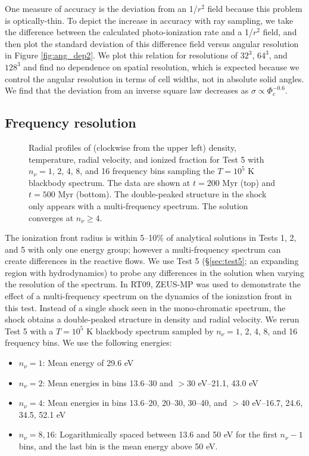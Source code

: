 \documentclass[useAMS,usenatbib,a4paper]{mn2e}
\begin{document}
One measure of accuracy is the deviation from an 1/$r^2$ field because
this problem is optically-thin.  To depict the increase in accuracy
with ray sampling, we take the difference between the calculated
photo-ionization rate and a 1/$r^2$ field, and then plot the standard
deviation of this difference field versus angular resolution in Figure
\ref{fig:ang_dep2}.  We plot this relation for resolutions of $32^3$,
$64^3$, and $128^3$ and find no dependence on spatial resolution,
which is expected because we control the angular resolution in terms
of cell widths, not in absolute solid angles.  We find that the
deviation from an inverse square law decreases as $\sigma \propto
\Phi_c^{-0.6}$.

\subsection{Frequency resolution}
\label{sec:nu_dep}

\begin{figure}
  \caption{\label{fig:nu_dep} Radial profiles of (clockwise from the
    upper left) density, temperature, radial velocity, and ionized
    fraction for Test 5 with $n_\nu = 1$, 2, 4, 8, and 16 frequency
    bins sampling the $T=10^5$ K blackbody spectrum.  The data are
    shown at $t = 200$ Myr (top) and $t = 500$ Myr (bottom).  The
    double-peaked structure in the shock only appears with a
    multi-frequency spectrum.  The solution converges at $n_\nu \ge
    4$.}
\end{figure}

The ionization front radius is within 5--10\% of analytical solutions
in Tests 1, 2, and 5 with only one energy group; however a
multi-frequency spectrum can create differences in the reactive flows.
We use Test 5 (\S\ref{sec:test5}; an expanding \hii region with
hydrodynamics) to probe any differences in the solution when varying
the resolution of the spectrum.  In RT09, ZEUS-MP was used to
demonstrate the effect of a multi-frequency spectrum on the dynamics
of the ionization front in this test.  Instead of a single shock seen
in the mono-chromatic spectrum, the shock obtains a double-peaked
structure in density and radial velocity.  We rerun Test 5 with a
$T=10^5$ K blackbody spectrum sampled by $n_\nu = 1$, 2, 4, 8, and 16
frequency bins.  We use the following energies:
%
\begin{itemize}
\item $n_\nu = 1$: Mean energy of 29.6 eV
\item $n_\nu = 2$: Mean energies in bins 13.6--30 and $>$30 eV--21.1,
  43.0 eV
\item $n_\nu = 4$: Mean energies in bins 13.6--20, 20--30, 30--40, and
  $>$40 eV--16.7, 24.6, 34.5, 52.1 eV
\item $n_\nu = 8, 16$: Logarithmically spaced between 13.6 and 50 eV
  for the first $n_\nu-1$ bins, and the last bin is the mean energy
  above 50 eV.
\end{itemize}
\end{document}
